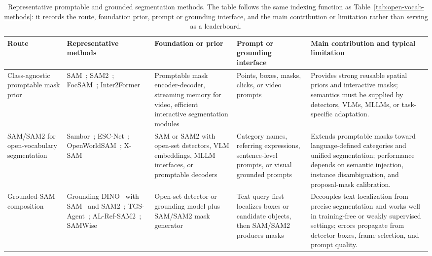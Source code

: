 \begin{table}[t]
\centering
\small
\setlength{\tabcolsep}{5pt}
\renewcommand{\arraystretch}{1.34}
\caption{Representative promptable and grounded segmentation methods. The table follows the same indexing function as Table~\ref{tab:open-vocab-methods}: it records the route, foundation prior, prompt or grounding interface, and the main contribution or limitation rather than serving as a leaderboard.}
\label{tab:promptable-grounded-methods}
\begin{tabularx}{\textwidth}{>{\raggedright\arraybackslash}p{}>{\raggedright\arraybackslash}X>{\raggedright\arraybackslash}p{}>{\raggedright\arraybackslash}p{}>{\raggedright\arraybackslash}p{}}
\toprule
Route & Representative methods & Foundation or prior & Prompt or grounding interface & Main contribution and typical limitation \\
\midrule
Class-agnostic promptable mask prior & SAM~\citep{kirillov2023sam}; SAM2~\citep{ravi2024sam2}; FocSAM~\citep{huangFocsamDelvingDeeply2024}; Inter2Former~\citep{huangInter2FormerDynamicHybrid2025} & Promptable mask encoder-decoder, streaming memory for video, efficient interactive segmentation modules & Points, boxes, masks, clicks, or video prompts & Provides strong reusable spatial priors and interactive masks; semantics must be supplied by detectors, VLMs, MLLMs, or task-specific adaptation. \\
SAM/SAM2 for open-vocabulary segmentation & Sambor~\citep{xhanBoostingSegmentAnything2025}; ESC-Net~\citep{mleeEffectiveSAMCombination2025}; OpenWorldSAM~\citep{sgxiaoOpenworldsamExtendingSam22026}; X-SAM~\citep{hwangXSAMSegmentAnything2026} & SAM or SAM2 with open-set detectors, VLM embeddings, MLLM interfaces, or promptable decoders & Category names, referring expressions, sentence-level prompts, or visual grounded prompts & Extends promptable masks toward language-defined categories and unified segmentation; performance depends on semantic injection, instance disambiguation, and proposal-mask calibration. \\
Grounded-SAM composition & Grounding DINO~\citep{liu2024groundingdino} with SAM~\citep{kirillov2023sam} and SAM2~\citep{ravi2024sam2}; TGS-Agent~\citep{zhouThinkYouSegment2026}; AL-Ref-SAM2~\citep{huangUnleashingTemporalspatialReasoning2025}; SAMWise~\citep{cuttanoSamwiseInfusingWisdom2025} & Open-set detector or grounding model plus SAM/SAM2 mask generator & Text query first localizes boxes or candidate objects, then SAM/SAM2 produces masks & Decouples text localization from precise segmentation and works well in training-free or weakly supervised settings; errors propagate from detector boxes, frame selection, and prompt quality. \\

\end{tabularx}
\end{table}
